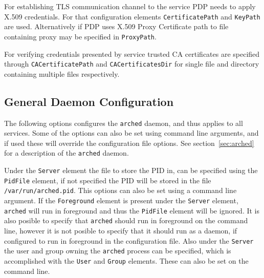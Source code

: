\documentclass{article}
\begin{document}
For establishing TLS communication channel to the service PDP needs to apply X.509 credentials.
For that configuration elements \texttt{CertificatePath} and \texttt{KeyPath} are used.
Alternatively if PDP uses X.509 Proxy Certificate path to file containing proxy may be
specified in \texttt{ProxyPath}.

For verifying credentials presented by service trusted CA certificates are specified through
\texttt{CACertificatePath} and \texttt{CACertificatesDir} for single file and directory 
containing multiple files respectively.

\subsection{General Daemon Configuration}\label{sec:General Daemon Configuration}
The following options configures the \texttt{arched} daemon, and thus applies to
all services. Some of the options can also be set using command line arguments,
and if used these will override the configuration file options. See
section~\ref{sec:arched} for a description of the \texttt{arched} daemon.

Under the \texttt{Server} element the file to store the PID in, can be specified
using the \texttt{PidFile} element, if not specified the PID will be stored in
the file \texttt{/var/run/arched.pid}. This options can also be set using a
command line argument. If the \texttt{Foreground} element is
present under the \texttt{Server} element, \texttt{arched} will run in
foreground and thus the \texttt{PidFile} element will be ignored. It is also
posible to specify that \texttt{arched} should run in foreground on the command
line, however it is not posible to specify that it should run as a daemon, if
configured to run in foreground in the configuration file. Also under the
\texttt{Server} the user and group owning the \texttt{arched} process can be
specified, which is accomplished with the \texttt{User} and \texttt{Group}
elements. These can also be set on the command line.
\end{document}
